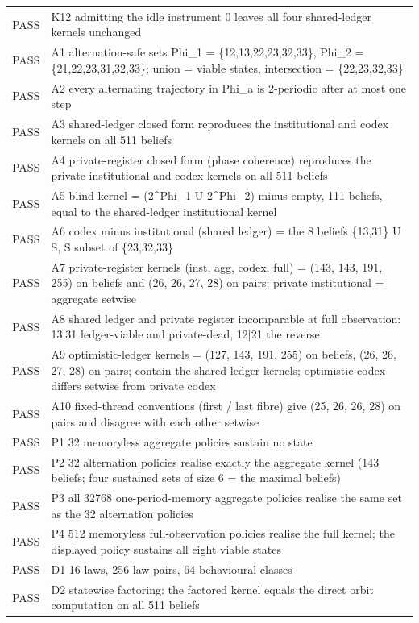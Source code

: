 \begin{longtable}{lp{}}
PASS & K12 admitting the idle instrument 0 leaves all four shared-ledger kernels unchanged \\
PASS & A1 alternation-safe sets Phi\_1 = \{12,13,22,23,32,33\}, Phi\_2 = \{21,22,23,31,32,33\}; union = viable states, intersection = \{22,23,32,33\} \\
PASS & A2 every alternating trajectory in Phi\_a is 2-periodic after at most one step \\
PASS & A3 shared-ledger closed form reproduces the institutional and codex kernels on all 511 beliefs \\
PASS & A4 private-register closed form (phase coherence) reproduces the private institutional and codex kernels on all 511 beliefs \\
PASS & A5 blind kernel = (2\^{}Phi\_1 U 2\^{}Phi\_2) minus empty, 111 beliefs, equal to the shared-ledger institutional kernel \\
PASS & A6 codex minus institutional (shared ledger) = the 8 beliefs \{13,31\} U S, S subset of \{23,32,33\} \\
PASS & A7 private-register kernels (inst, agg, codex, full) = (143, 143, 191, 255) on beliefs and (26, 26, 27, 28) on pairs; private institutional = aggregate setwise \\
PASS & A8 shared ledger and private register incomparable at full observation: 13$|$31 ledger-viable and private-dead, 12$|$21 the reverse \\
PASS & A9 optimistic-ledger kernels = (127, 143, 191, 255) on beliefs, (26, 26, 27, 28) on pairs; contain the shared-ledger kernels; optimistic codex differs setwise from private codex \\
PASS & A10 fixed-thread conventions (first / last fibre) give (25, 26, 26, 28) on pairs and disagree with each other setwise \\
PASS & P1 32 memoryless aggregate policies sustain no state \\
PASS & P2 32 alternation policies realise exactly the aggregate kernel (143 beliefs; four sustained sets of size 6 = the maximal beliefs) \\
PASS & P3 all 32768 one-period-memory aggregate policies realise the same set as the 32 alternation policies \\
PASS & P4 512 memoryless full-observation policies realise the full kernel; the displayed policy sustains all eight viable states \\
PASS & D1 16 laws, 256 law pairs, 64 behavioural classes \\
PASS & D2 statewise factoring: the factored kernel equals the direct orbit computation on all 511 beliefs \\

\end{longtable}

